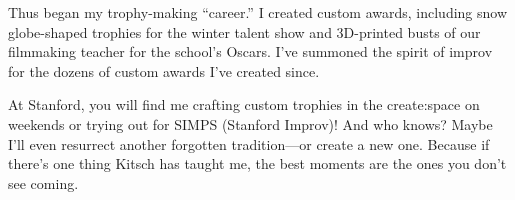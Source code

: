 \documentclass[10pt]{article}
\begin{document}
{Thus began my trophy-making “career.” I created custom awards, including snow globe-shaped trophies for the winter talent show and 3D-printed busts of our filmmaking teacher for the school’s Oscars. I've summoned the spirit of improv for the dozens of custom awards I've created since.

At Stanford, you will find me crafting custom trophies in the create:space on weekends or trying out for SIMPS (Stanford Improv)! And who knows? Maybe I’ll even resurrect another forgotten tradition—or create a new one. Because if there’s one thing Kitsch has taught me, the best moments are the ones you don’t see coming.
}
\end{document}
